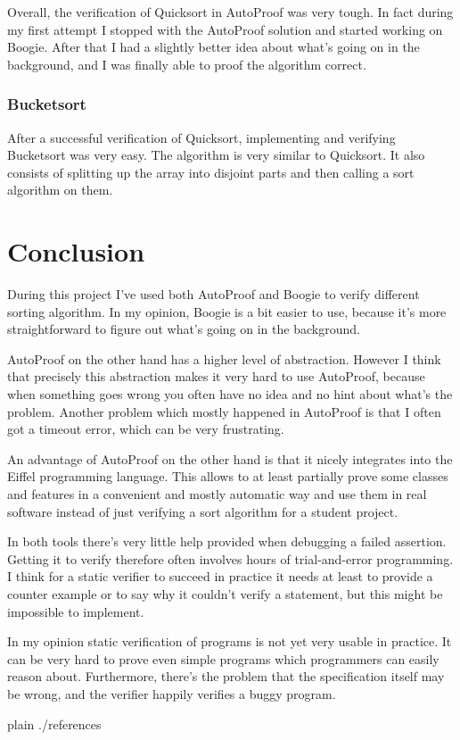\documentclass[a4paper,10pt]{article}
\begin{document}
Overall, the verification of Quicksort in AutoProof was very tough.
In fact during my first attempt I stopped with the AutoProof solution and started working on Boogie.
After that I had a slightly better idea about what's going on in the background, and I was finally able to proof the algorithm correct.

\subsubsection{Bucketsort}

After a successful verification of Quicksort, implementing and verifying Bucketsort was very easy.
The algorithm is very similar to Quicksort.
It also consists of splitting up the array into disjoint parts and then calling a sort algorithm on them.

\section {Conclusion}

During this project I've used both AutoProof and Boogie to verify different sorting algorithm.
In my opinion, Boogie is a bit easier to use, because it's more straightforward to figure out what's going on in the background.

AutoProof on the other hand has a higher level of abstraction.
However I think that precisely this abstraction makes it very hard to use AutoProof, 
because when something goes wrong you often have no idea and no hint about what's the problem.
Another problem which mostly happened in AutoProof is that I often got a timeout error, which can be very frustrating.

An advantage of AutoProof on the other hand is that it nicely integrates into the Eiffel programming language.
This allows to at least partially prove some classes and features in a convenient and mostly automatic way
and use them in real software instead of just verifying a sort algorithm for a student project.

In both tools there's very little help provided when debugging a failed assertion.
Getting it to verify therefore often involves hours of trial-and-error programming.
I think for a static verifier to succeed in practice it needs at least to provide a counter example 
or to say why it couldn't verify a statement, but this might be impossible to implement.

In my opinion static verification of programs is not yet very usable in practice.
It can be very hard to prove even simple programs which programmers can easily reason about.
Furthermore, there's the problem that the specification itself may be wrong, and the verifier happily verifies a buggy program.

\todos

\begin{flushleft}
{{{
 {plain}
 {./references}
}}}
\end{flushleft}
\end{document}
